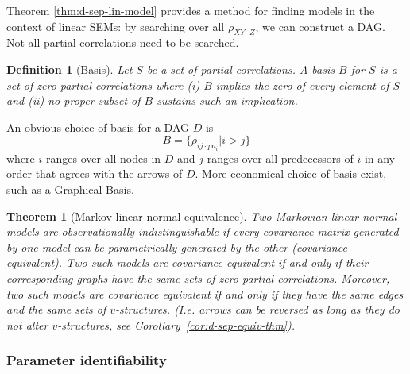 \documentclass[11pt]{article}
\numberwithin{equation}{section}
\newtheorem{thm}{Theorem}[section]
\newtheorem{defn}{Definition}[section]
\begin{document}
Theorem \ref{thm:d-sep-lin-model} provides a method for finding models in the context of linear SEMs: by searching over all $\rho_{XY\cdot Z}$, we can construct a DAG. Not all partial correlations need to be searched.

\begin{defn}[Basis]
Let $S$ be a set of partial correlations. A basis $B$ for $S$ is a set of zero partial correlations where (i) $B$ implies the zero of every element of $S$ and (ii) no proper subset of $B$ sustains such an implication.
\end{defn}

An obvious choice of basis for a DAG $D$ is
\begin{equation}
B = \{\rho_{ij\cdot pa_{i}} | i>j \} 
\end{equation}
where $i$ ranges over all nodes in $D$ and $j$ ranges over all predecessors of $i$ in any order that agrees with the arrows of $D$. More economical choice of basis exist, such as a Graphical Basis. 

\begin{thm}[Markov linear-normal equivalence]
Two Markovian linear-normal models are observationally indistinguishable if every covariance matrix generated by one model can be parametrically generated by the other (covariance equivalent). Two such models are covariance equivalent if and only if their corresponding graphs have the same sets of zero partial correlations. Moreover, two such models are covariance equivalent if and only if they have the same edges and the same sets of $v$-structures. (I.e. arrows can be reversed as long as they do not alter $v$-structures, see Corollary~\ref{cor:d-sep-equiv-thm}).
\end{thm}


\subsubsection{Parameter identifiability}
\end{document}
